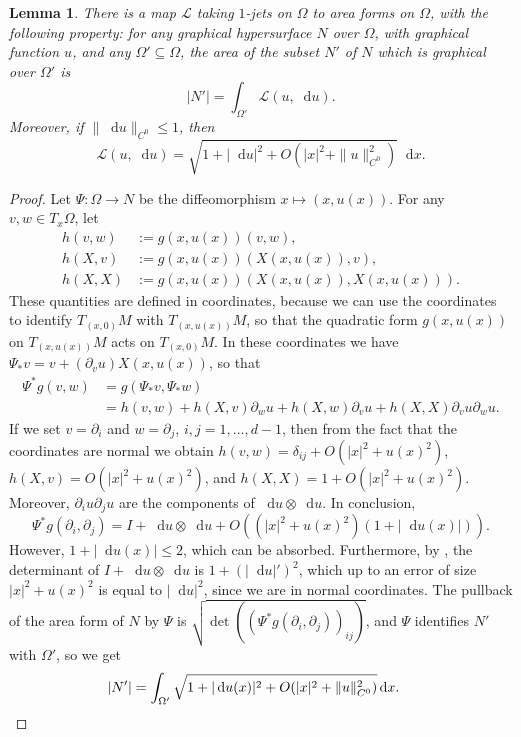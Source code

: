 \documentclass[reqno,11pt]{amsart}
\newcommand*\dif{\mathop{}\!\mathrm{d}}
\newcommand{\Lagrange}{\mathscr L}
\newtheorem{lemma}[theorem]{Lemma}
\theoremstyle{definition}
\numberwithin{equation}{section}
\begin{document}
\begin{lemma}
There is a map $\Lagrange$ taking $1$-jets on $\Omega$ to area forms on $\Omega$, with the following property: for any graphical hypersurface $N$ over $\Omega$, with graphical function $u$, and any $\Omega' \subseteq \Omega$, the area of the subset $N'$ of $N$ which is graphical over $\Omega'$ is
$$|N'| = \int_{\Omega'} \Lagrange(u, \dif u).$$
Moreover, if $\|\dif u\|_{C^0} \leq 1$, then
$$\Lagrange(u, \dif u) = \sqrt{1 + |\dif u|^2 + O(|x|^2 + \|u\|_{C^0}^2)} \dif x.$$
\end{lemma}
\begin{proof}
Let $\Psi: \Omega \to N$ be the diffeomorphism $x \mapsto (x, u(x))$.
For any $v, w \in T_x \Omega$, let
\begin{align*}
h(v, w) &:= g(x, u(x))(v, w), \\
h(X, v) &:= g(x, u(x))(X(x, u(x)), v), \\
h(X, X) &:= g(x, u(x))(X(x, u(x)), X(x, u(x))).
\end{align*}
These quantities are defined in coordinates, because we can use the coordinates to identify $T_{(x, 0)}M$ with $T_{(x, u(x))} M$, so that the quadratic form $g(x, u(x))$ on $T_{(x, u(x))} M$ acts on $T_{(x, 0)}M$.
In these coordinates we have $\Psi_* v = v + (\partial_v u) X(x, u(x))$, so that
\begin{align*}
\Psi^* g(v, w)
&= g(\Psi_* v, \Psi_* w) \\
&= h(v, w) + h(X, v) \partial_w u + h(X, w) \partial_v u + h(X, X) \partial_v u \partial_w u.
\end{align*}
If we set $v = \partial_i$ and $w = \partial_j$, $i, j = 1, \dots, d - 1$, then from the fact that the coordinates are normal we obtain $h(v, w) = \delta_{ij} + O(|x|^2 + u(x)^2)$, $h(X, v) = O(|x|^2 + u(x)^2)$, and $h(X, X) = 1 + O(|x|^2 + u(x)^2)$.
Moreover, $\partial_i u \partial_j u$ are the components of $\dif u \otimes \dif u$.
In conclusion,
$$\Psi^* g(\partial_i, \partial_j) = I + \dif u \otimes \dif u + O((|x|^2 + u(x)^2)(1 + |\dif u(x)|)).$$
However, $1 + |\dif u(x)| \leq 2$, which can be absorbed.
Furthermore, by \cite[(24)]{Petersen2008}, the determinant of $I + \dif u \otimes \dif u$ is $1 + (|\dif u|')^2$, which up to an error of size $|x|^2 + u(x)^2$ is equal to $|\dif u|^2$, since we are in normal coordinates.
The pullback of the area form of $N$ by $\Psi$ is $\sqrt{\det((\Psi^* g(\partial_i, \partial_j))_{ij})}$, and $\Psi$ identifies $N'$ with $\Omega'$, so we get 
\begin{align*}
|N'| &= \int_{\Omega'} \sqrt{1 + |\dif u(x)|^2 + O(|x|^2 + \|u\|_{C^0}^2)} \dif x. \qedhere
\end{align*}
\end{proof}
\end{document}
